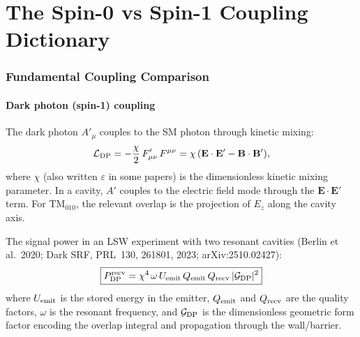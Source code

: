 \documentclass[11pt]{article}
\theoremstyle{definition}
\theoremstyle{remark}
\begin{document}
\part{The Spin-0 vs Spin-1 Coupling Dictionary}
\label{part:dictionary}


\section{Fundamental Coupling Comparison}
\label{sec:coupling_comparison}

\subsection{Dark photon (spin-1) coupling}

The dark photon $A'_\mu$ couples to the SM photon through kinetic mixing:
\begin{equation}
\mathcal{L}_{\rm DP} = -\frac{\chi}{2}\,F'_{\mu\nu}\,F^{\mu\nu}
= \chi\,(\mathbf{E}\cdot\mathbf{E}' - \mathbf{B}\cdot\mathbf{B}'),
\label{eq:L_DP}
\end{equation}
where $\chi$ (also written $\varepsilon$ in some papers) is the dimensionless
kinetic mixing parameter. In a cavity, $A'$ couples to the electric field
mode through the $\mathbf{E}\cdot\mathbf{E}'$ term. For TM$_{010}$, the
relevant overlap is the projection of $E_z$ along the cavity axis.

The signal power in an LSW experiment with two resonant cavities
(Berlin et al.\ 2020; Dark SRF, PRL~130, 261801, 2023; arXiv:2510.02427):
\begin{equation}
\boxed{
P_{\rm DP}^{\rm recv} = \chi^4\,\omega\,U_{\rm emit}\,Q_{\rm emit}\,
Q_{\rm recv}\,|\mathcal{G}_{\rm DP}|^2
}
\label{eq:P_DP}
\end{equation}
where $U_{\rm emit}$ is the stored energy in the emitter, $Q_{\rm emit}$
and $Q_{\rm recv}$ are the quality factors, $\omega$ is the resonant
frequency, and $\mathcal{G}_{\rm DP}$ is the dimensionless geometric
form factor encoding the overlap integral and propagation through the
wall/barrier.
\end{document}
